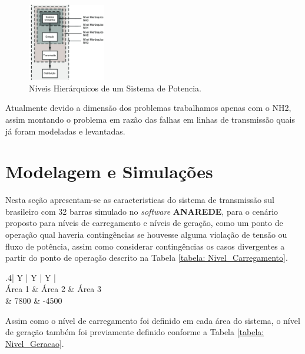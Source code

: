 \documentclass[lettersize,journal]{IEEEtran}
\begin{document}
\begin{figure}[h]
	\includegraphics[width=0.3\textwidth]{Figuras/Figura-1-Niveis-Hierarquicos-de-um-Sistema-de-Potencia.jpg}
	\centering
	\caption{Níveis Hierárquicos de um Sistema de Potencia\cite{Cassula2003}.}
	\label{figura: Niveis_Hierarquicos}
\end{figure}

Atualmente devido a dimensão dos problemas trabalhamos apenas com o NH2, assim montando o problema em razão das falhas em linhas de transmissão quais já foram modeladas e levantadas.

\section{Modelagem e Simulações}

Nesta seção apresentam-se as caracteristicas do sistema de transmissão sul brasileiro com 32 barras simulado no \textit{software} \textbf{ANAREDE}, para o cenário proposto para níveis de carregamento e níveis de geração, como um ponto de operação qual haveria contingências se houvesse alguma violação de tensão ou fluxo de potência, assim como considerar contingências os casos divergentes a partir do ponto de operação descrito na Tabela \ref{tabela: Nivel_Carregamento}.

\begin{table}[ht]
	\caption{Configuração do Nível de Carregamento(MW)}
	\label{tabela: Nivel_Carregamento}
	\centering
	\begin{tabularx}{.4\textwidth}{| Y | Y | Y |}
		\hline
		 \\
		\hline
		Área 1 & Área 2 & Área 3 \\
		 & 7800 & -4500 \\
		\hline
	\end{tabularx}
\end{table}

Assim como o nível de carregamento foi definido em cada área do sistema, o nível de geração também foi previamente definido conforme a Tabela \ref{tabela: Nivel_Geracao}.
\end{document}
